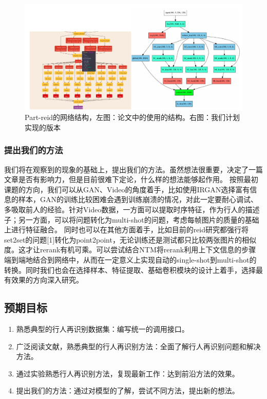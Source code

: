 \begin{figure}[!htbp]
    \centering
    \includegraphics[width=\linewidth,keepaspectratio]{data/kaitibaogao/vis3.png}
    \caption{Part-reid的网络结构，左图：论文中的使用的结构。右图：我们计划实现的版本}
    \label{figure:vis3}
\end{figure}

\subsubsection{提出我们的方法}

我们将在观察到的现象的基础上，提出我们的方法。虽然想法很重要，决定了一篇文章是否有影响力，但是目前很难下定论，什么样的想法能够起作用。
按照最初课题的方向，我们可以从GAN、Video的角度着手，比如使用IRGAN选择富有信息的样本，GAN的训练比较困难会遇到训练崩溃的情况，对此一定要耐心调试、多吸取前人的经验。针对Video数据，一方面可以提取时序特征，作为行人的描述子；另一方面，可以将问题转化为multi-shot的问题，考虑每帧图片的质量的基础上进行特征融合。
同时也可以在其他方面着手，比如目前的reid研究都强行将set2set的问题[1]转化为point2point，无论训练还是测试都只比较两张图片的相似度。这才让rerank有机可乘。可以尝试结合NTM将rerank利用上下文信息的步骤端到端地结合到网络中，从而在一定意义上实现自动的single-shot到multi-shot的转换。同时我们也会在选择样本、特征提取、基础卷积模块的设计上着手，选择最有效果的方向深入研究。

\subsection{预期目标}

\begin{enumerate} 
\item 熟悉典型的行人再识别数据集：编写统一的调用接口。
\item 广泛阅读文献，熟悉典型的行人再识别方法：全面了解行人再识别问题和解决方法。
\item 通过实验熟悉行人再识别方法，复现最新工作：达到前沿方法的效果。
\item 提出我们的方法：通过对模型的了解，尝试不同方法，提出新的想法。
\end{enumerate}

